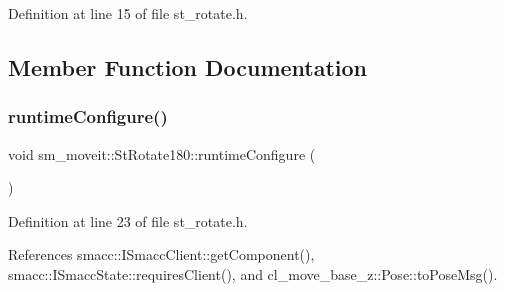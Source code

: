 Definition at line 15 of file st\+\_\+rotate.\+h.



\subsection{Member Function Documentation}
\mbox{\label{structsm__moveit_1_1StRotate180_af424dc219c107d5c3678c6fc915d9c68}} 
\subsubsection{\texorpdfstring{runtime\+Configure()}{runtimeConfigure()}}
{\footnotesize\ttfamily void sm\+\_\+moveit\+::\+St\+Rotate180\+::runtime\+Configure (\begin{DoxyParamCaption}{ }\end{DoxyParamCaption})\hspace{0.3cm}{\ttfamily [inline]}}



Definition at line 23 of file st\+\_\+rotate.\+h.



References smacc\+::\+I\+Smacc\+Client\+::get\+Component(), smacc\+::\+I\+Smacc\+State\+::requires\+Client(), and cl\+\_\+move\+\_\+base\+\_\+z\+::\+Pose\+::to\+Pose\+Msg().


